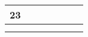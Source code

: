 \begin{table}[ht]
{\begin{tabular}{cllllcc}
	\multicolumn{1}{|c|}{23}          & \multicolumn{1}{l|}{}           & \multicolumn{1}{l|}{}                                                                                                                                                                                             & \multicolumn{1}{l|}{}                                                                                                                                     & \multicolumn{1}{l|}{}                                                                                                                                                                                                                & \multicolumn{1}{c|}{}                                                                                & \multicolumn{1}{c|}{}                                                                                 \\ \hline
	\multicolumn{1}{l}{}              &                                 &                                                                                                                                                                                                                   &                                                                                                                                                           &                                                                                                                                                                                                                                      & \multicolumn{1}{l}{}                                                                                 & \multicolumn{1}{l}{}                                                                                  \\
	\multicolumn{1}{l}{}              &                                 &                                                                                                                                                                                                                   &                                                                                                                                                           &                                                                                                                                                                                                                                      & \multicolumn{1}{l}{}                                                                                 & \multicolumn{1}{l}{}                                                                                  \\

\end{tabular}}
\end{table}
